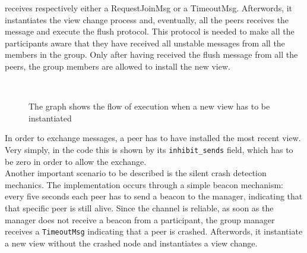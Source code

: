 \documentclass[conference]{IEEEtran}
\begin{document}
receives respectively either a RequestJoinMsg or a TimeoutMsg.
Afterwords, it instantiates the view change process and,
eventually, all the peers receives the message and execute the flush
protocol. This protocol is needed to make all the participants aware
that they have received all unstable messages from all the members
in the group.
Only after having received the flush message from all the peers, the 
group members are allowed to install the new view. \\
\begin{figure}[ht]%
	\centering
	\\%
	\caption{The graph shows the flow of execution when a new view has
	to be instantiated}%
	\label{fig:NewView}%
\end{figure}
In order to exchange messages, a peer has to have installed the most 
recent view. Very simply, in the code this is shown by its
\texttt{inhibit\_sends} field, which has to be zero in order to allow 
the exchange. \\
Another important scenario to be described is the silent crash detection
mechanics. The implementation occurs through a simple beacon mechanism:
every five seconds each peer has to send a beacon to the manager, 
indicating that that specific peer is still alive. Since the channel 
is reliable, as soon as the manager does not receive a beacon from 
a participant, the group manager receives a \texttt{TimeoutMsg}
indicating that a peer is crashed. Afterwords, it instantiate a new
view without the crashed node and instantiates a view change. 

\end{document}
